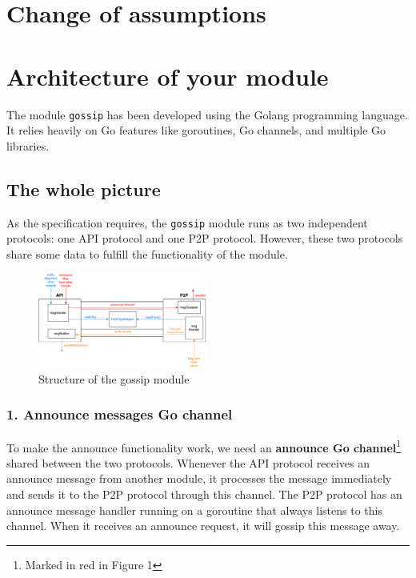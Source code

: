 \section{Change of assumptions}

\section{Architecture of your module}
The module \texttt{gossip} has been developed using the Golang programming language. It relies heavily on Go features like goroutines, Go channels, and multiple Go libraries. 

\subsection{The whole picture}

As the specification requires, the \texttt{gossip} module runs as two independent protocols: one API protocol and one P2P protocol. However, these two protocols share some data to fulfill the functionality of the module. 

\begin{figure}[H]
    \centering
    \includegraphics[width=0.5\textwidth]{pics/structure.png}
    \caption{Structure of the gossip module}
\end{figure}

\subsubsection{1. Announce messages Go channel}

To make the announce functionality work, we need an \textbf{announce Go channel}\footnote{Marked in red in Figure 1} shared between the two protocols. Whenever the API protocol receives an announce message from another module, it processes the message immediately and sends it to the P2P protocol through this channel. The P2P protocol has an announce message handler running on a goroutine that always listens to this channel. When it receives an announce request, it will gossip this message away. 

